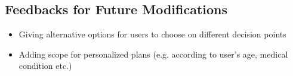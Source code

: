 \documentclass[12pt]{article}
\begin{document}

\subsection{Feedbacks for Future Modifications}
\begin{itemize}
    \item Giving alternative options for users to choose on different decision points
    \item Adding scope for personalized plans (e.g. according to user's age, medical condition etc.)
\end{itemize}
\end{document}
